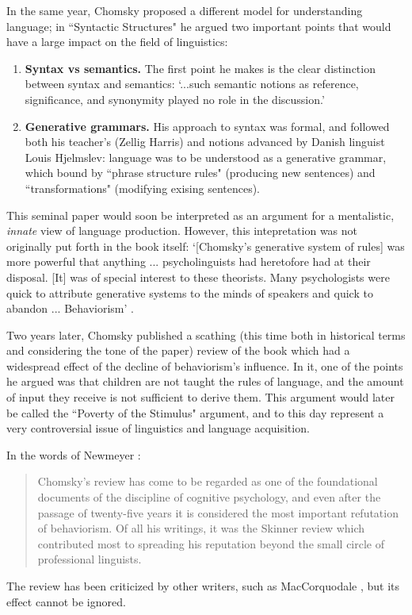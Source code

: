 \documentclass[../main.tex]{subfiles}
\begin{document}
In the same year, Chomsky proposed a different model for understanding language; in ``Syntactic Structures" he argued two important points that would have a large impact on the field of linguistics:
\begin{enumerate}
    \item \textbf{Syntax vs semantics.} The first point he makes is the clear distinction between syntax and semantics: \enquote*{...such semantic notions as reference, significance, and synonymity played no role in the discussion.}
    \item \textbf{Generative grammars.} His approach to syntax was formal, and followed both his teacher's (Zellig Harris) and notions advanced by Danish linguist Louis Hjelmslev: language was to be understood as a generative grammar, which bound by ``phrase structure rules" (producing new sentences) and ``transformations" (modifying exising sentences).
\end{enumerate}
This seminal paper would soon be interpreted as an argument for a mentalistic, \textit{innate} view of language production. However, this intepretation was not originally put forth in the book itself: \enquote*{[Chomsky's generative system of rules] was more powerful that anything ... psycholinguists had heretofore had at their disposal. [It] was of special interest to these theorists. Many psychologists were quick to attribute generative systems to the minds of speakers and quick to abandon ... Behaviorism} \parencite{steinbergPsycholinguisticsLanguageMind2013}.

Two years later, Chomsky published a scathing (this time both in historical terms and considering the tone of the paper) review  \parencite{chomskyReviewBFSkinner2013} of the book which had a widespread effect of the decline of behaviorism's influence. In it, one of the points he argued was that children are not taught the rules of language, and the amount of input they receive is not sufficient to derive them. This argument would later be called the ``Poverty of the Stimulus" argument, and to this day represent a very controversial issue of linguistics and language acquisition.

In the words of Newmeyer \parencite{newmeyerPoliticsLinguistics1986}:
\begin{quote}
    Chomsky's review has come to be regarded as one of the foundational documents of the discipline of cognitive psychology, and even after the passage of twenty-five years it is considered the most important refutation of behaviorism. Of all his writings, it was the Skinner review which contributed most to spreading his reputation beyond the small circle of professional linguists.
\end{quote}
The review has been criticized by other writers, such as MacCorquodale \parencite{maccorquodaleChomskyReviewSkinner1970}, but its effect cannot be ignored.
\end{document}
